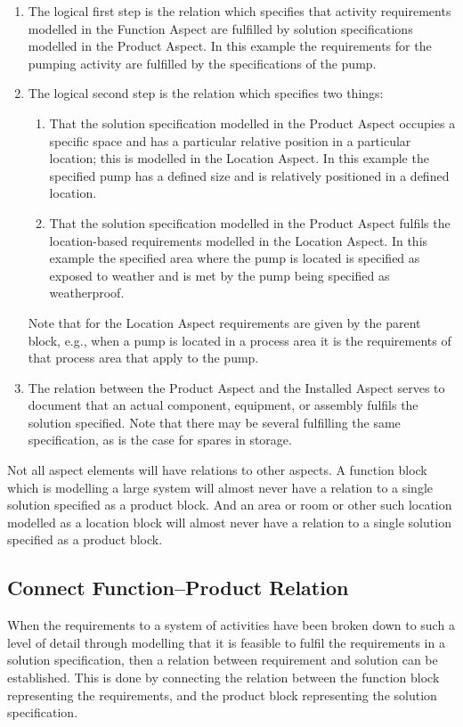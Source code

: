 \documentclass[../main.tex]{subfiles}
\begin{document}
\begin{enumerate}
  \item The logical first step is the relation which specifies that activity requirements modelled in the Function Aspect are
        fulfilled by solution specifications modelled in the Product Aspect. In this example the requirements for the pumping
        activity are fulfilled by the specifications of the pump.
  \item The logical second step is the relation which specifies two things:

        \begin{enumerate}
          \item That the solution specification modelled in the Product Aspect occupies a specific space and has a particular
                relative position in a particular location; this is modelled in the Location Aspect. In this example the specified
                pump has a defined size and is relatively positioned in a defined location.
          \item That the solution specification modelled in the Product Aspect fulfils the location-based requirements modelled
                in the Location Aspect. In this example the specified area where the pump is located is specified as exposed to
                weather and is met by the pump being specified as weatherproof.
        \end{enumerate}

Note that for the Location Aspect requirements are given by the parent block, e.g., when a pump is
located in a process area it is the requirements of that process area that apply to the pump.

  \item The relation between the Product Aspect and the Installed Aspect serves to document that an actual component,
        equipment, or assembly fulfils the solution specified. Note that there may be several fulfilling the same
        specification, as is the case for spares in storage.
\end{enumerate}
Not all aspect elements will have relations to other aspects. A function block which is modelling a large
system will almost never have a relation to a single solution specified as a product block. And an area or room or other such location
modelled as a location block will almost never have a relation to a single solution specified as a product block.

\subsection{Connect Function--Product Relation}
When the requirements to a system of activities have been broken down to such a level of
detail through modelling that it is feasible to fulfil the requirements in a solution specification, then a relation
between requirement and solution can be established. This is done by connecting the relation between the function
block representing the requirements, and the product block representing the solution specification.
\end{document}
